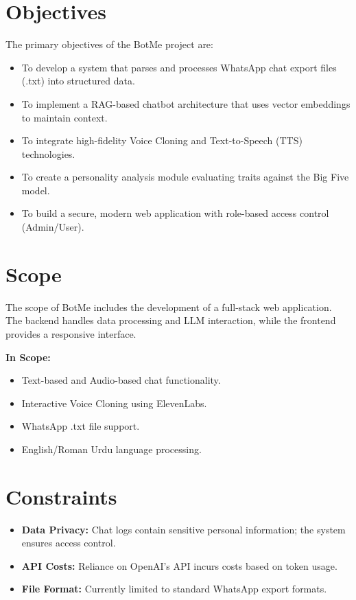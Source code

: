 \documentclass[12pt,a4paper]{report}
\begin{document}
\section{Objectives}
The primary objectives of the BotMe project are:
\begin{itemize}
    \item To develop a system that parses and processes WhatsApp chat export files (.txt) into structured data.
    \item To implement a RAG-based chatbot architecture that uses vector embeddings to maintain context.
    \item To integrate high-fidelity Voice Cloning and Text-to-Speech (TTS) technologies.
    \item To create a personality analysis module evaluating traits against the Big Five model.
    \item To build a secure, modern web application with role-based access control (Admin/User).
\end{itemize}

\section{Scope}
The scope of BotMe includes the development of a full-stack web application. The backend handles data processing and LLM interaction, while the frontend provides a responsive interface.

\textbf{In Scope:}
\begin{itemize}
    \item Text-based and Audio-based chat functionality.
    \item Interactive Voice Cloning using ElevenLabs.
    \item WhatsApp .txt file support.
    \item English/Roman Urdu language processing.
\end{itemize}

\section{Constraints}
\begin{itemize}
    \item \textbf{Data Privacy:} Chat logs contain sensitive personal information; the system ensures access control.
    \item \textbf{API Costs:} Reliance on OpenAI's API incurs costs based on token usage.
    \item \textbf{File Format:} Currently limited to standard WhatsApp export formats.
\end{itemize}
\end{document}
